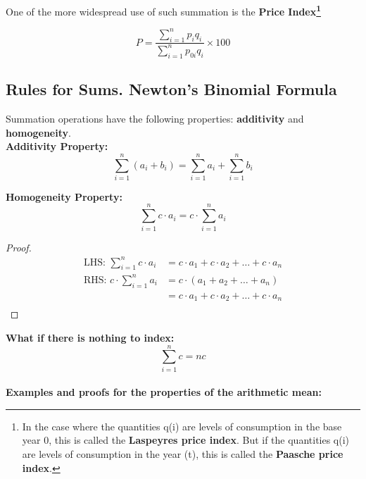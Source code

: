 \documentclass{article}
\begin{document}
One of the more widespread use of such summation is the \textbf{Price Index\footnote{In the case where the quantities q(i) are levels of consumption in the base year 0, this is called the\textbf{ Laspeyres price index}. But if the quantities q(i) are levels of consumption in the year (t), this is called the \textbf{Paasche price index}.
}}

\begin{equation}
    P = \frac{\sum_{i=1}^{n} p_i q_i}{\sum_{i=1}^{n} p_{0i} q_i} \times 100
\end{equation}



\subsection{Rules for Sums. Newton’s Binomial Formula}

Summation operations have the following properties: \textbf{additivity} and \textbf{homogeneity}.\\

\textbf{Additivity Property:}
\begin{equation}
\sum_{i=1}^{n} (a_i + b_i) = \sum_{i=1}^{n} a_i + \sum_{i=1}^{n} b_i
\end{equation}

\textbf{Homogeneity Property:}
\begin{equation}
\sum_{i=1}^{n} c \cdot a_i = c \cdot \sum_{i=1}^{n} a_i
\end{equation}

\begin{proof}
\begin{align*}
\text{LHS: } \sum_{i=1}^{n} c \cdot a_i &= c \cdot a_1 + c \cdot a_2 + \ldots + c \cdot a_n \\
\text{RHS: } c \cdot \sum_{i=1}^{n} a_i &= c \cdot (a_1 + a_2 + \ldots + a_n) \\
&= c \cdot a_1 + c \cdot a_2 + \ldots + c \cdot a_n \\
\end{align*}
\end{proof}

\textbf{What if there is nothing to index:}
\begin{equation}
\sum_{i=1}^{n} c  = nc 
\end{equation} \\

\textbf{Examples and proofs for the properties of the arithmetic mean:} \\
\end{document}
